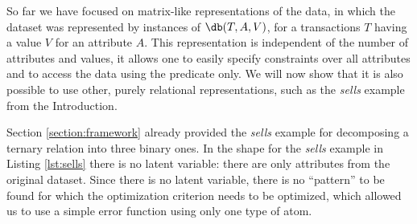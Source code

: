 \label{sec:pure_decomposition}


So far we have focused on matrix-like representations of the data, in which the dataset was represented by instances of $\db(T,A,V)$, for a transactions $T$ having a value $V$ for an attribute $A$. This representation is independent of the number of attributes and values, it allows one to easily specify constraints over all attributes and to access the data using the predicate \db only.
We will now show that it is also possible to use other, purely relational representations, such as the {\em sells} example from the Introduction.

Section \ref{section:framework} already provided the {\em sells} example for decomposing 
a ternary relation into three binary ones.   In the shape for the {\em sells} example in Listing \ref{lst:sells}
there is no latent variable: there are only attributes from the original dataset. 
Since there is no latent variable, there is no ``pattern'' to be found for which the optimization criterion needs to be optimized, 
which allowed us to use a simple error function using only one type of atom. 

